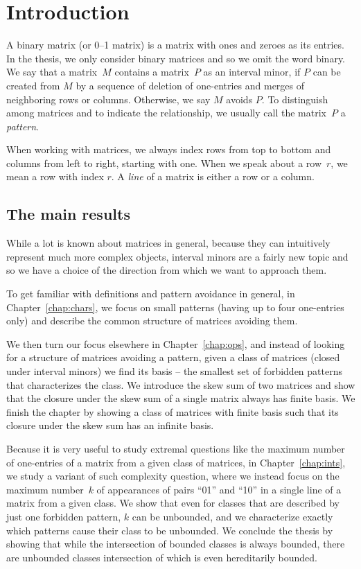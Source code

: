\chapter{Introduction}
A binary matrix (or 0--1 matrix) is a matrix with ones and zeroes as its entries. In the thesis, we only consider binary matrices and so we omit the word binary. We say that a matrix~$M$ contains a matrix~$P$ as an interval minor, if $P$ can be created from $M$ by a sequence of deletion of one-entries and merges of neighboring rows or columns. Otherwise, we say $M$ avoids $P$. To distinguish among matrices and to indicate the relationship, we usually call the matrix~$P$ a \emph{pattern}.

When working with matrices, we always index rows from top to bottom and columns from left to right, starting with one. When we speak about a row~$r$, we mean a row with index $r$. A \emph{line} of a matrix is either a row or a column.

\section{The main results}
While a lot is known about matrices in general, because they can intuitively represent much more complex objects, interval minors are a fairly new topic and so we have a choice of the direction from which we want to approach them.

To get familiar with definitions and pattern avoidance in general, in Chapter~\ref{chap:chars}, we focus on small patterns (having up to four one-entries only) and describe the common structure of matrices avoiding them.

We then turn our focus elsewhere in Chapter~\ref{chap:ops}, and instead of looking for a structure of matrices avoiding a pattern, given a class of matrices (closed under interval minors) we find its basis -- the smallest set of forbidden patterns that characterizes the class. We introduce the skew sum of two matrices and show that the closure under the skew sum of a single matrix always has finite basis. We finish the chapter by showing a class of matrices with finite basis such that its closure under the skew sum has an infinite basis.

Because it is very useful to study extremal questions like the maximum number of one-entries of a matrix from a given class of matrices, in Chapter~\ref{chap:ints}, we study a variant of such complexity question, where we instead focus on the maximum number~$k$ of appearances of pairs ``01'' and ``10'' in a single line of a matrix from a given class. We show that even for classes that are described by just one forbidden pattern, $k$ can be unbounded, and we characterize exactly which patterns cause their class to be unbounded. We conclude the thesis by showing that while the intersection of bounded classes is always bounded, there are unbounded classes intersection of which is even hereditarily bounded.

